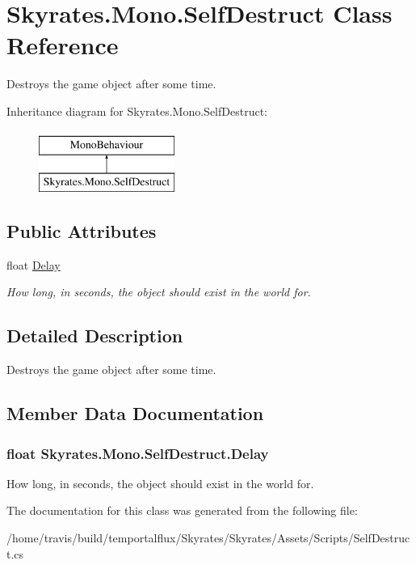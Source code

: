 \hypertarget{class_skyrates_1_1_mono_1_1_self_destruct}{\section{Skyrates.\-Mono.\-Self\-Destruct Class Reference}
\label{class_skyrates_1_1_mono_1_1_self_destruct}
}


Destroys the game object after some time.  


Inheritance diagram for Skyrates.\-Mono.\-Self\-Destruct\-:\begin{figure}[H]
\begin{center}
\leavevmode
\includegraphics[height=2.000000cm]{class_skyrates_1_1_mono_1_1_self_destruct}
\end{center}
\end{figure}
\subsection*{Public Attributes}
\begin{DoxyCompactItemize}
\item 
float \hyperlink{class_skyrates_1_1_mono_1_1_self_destruct_a922acaf93a559878b519ec239e050915}{Delay}
\begin{DoxyCompactList}\small\item\em How long, in seconds, the object should exist in the world for. \end{DoxyCompactList}\end{DoxyCompactItemize}


\subsection{Detailed Description}
Destroys the game object after some time. 



\subsection{Member Data Documentation}
\hypertarget{class_skyrates_1_1_mono_1_1_self_destruct_a922acaf93a559878b519ec239e050915}{
\subsubsection[{Delay}]{\setlength{\rightskip}{0pt plus 5cm}float Skyrates.\-Mono.\-Self\-Destruct.\-Delay}}\label{class_skyrates_1_1_mono_1_1_self_destruct_a922acaf93a559878b519ec239e050915}


How long, in seconds, the object should exist in the world for. 



The documentation for this class was generated from the following file\-:\begin{DoxyCompactItemize}
\item 
/home/travis/build/temportalflux/\-Skyrates/\-Skyrates/\-Assets/\-Scripts/Self\-Destruct.\-cs\end{DoxyCompactItemize}
